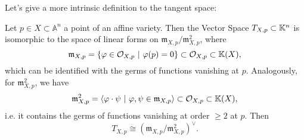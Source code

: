 Let's give a more intrinsic definition to the tangent space:
\begin{lem}
	Let $p \in X \subset \mathbb{A}^{n}$ a point of an affine variety.
	Then the Vector Space $T_{X,p} \subset \mathbb{K}^n$ is isomorphic to the space of
	linear forms on $\mathfrak{m}_{X,p}/\mathfrak{m}^2_{X,p}$, where
	\begin{equation}
		\mathfrak{m}_{X,p} = \left\{ \varphi \in \mathcal{O}_{X,p} \ \middle|\ \varphi(p) = 0 \right\}
	\subset \mathcal{O}_{X,p} \subset \mathbb{K}(X)
	,\end{equation} 
	which can be identified with the germs of functions vanishing at $p$.
	Analogously, for $\mathfrak{m}^2_{X,p}$, we have
	\begin{equation}
	\mathfrak{m}^2_{X,p} = \left\langle \varphi \cdot \psi \ \middle|\ 
\varphi, \psi \in \mathfrak{m}_{X,p} \right\rangle
	\subset \mathcal{O}_{X,p} \subset \K(X)
	,\end{equation} 
	i.e. it contains the germs of functions vanishing at order $\geq 2$ at $p$.
	Then
	\begin{equation}
		T_{X,p} \cong \left( \mathfrak{m}_{X,p}/\mathfrak{m}^2_{X,p} \right)^{\vee}
	.\end{equation} 
\end{lem} 
